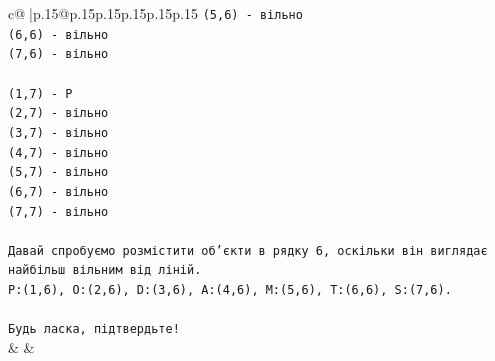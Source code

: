 \documentclass{article}
\begin{document}
{\begin{supertabular}{c@{$\;$}|p{.15\linewidth}@{}p{.15\linewidth}p{.15\linewidth}p{.15\linewidth}p{.15\linewidth}p{.15\linewidth}}
{{{\texttt{(5,6) {-} вільно} \\
\texttt{(6,6) {-} вільно} \\
\texttt{(7,6) {-} вільно} \\
\\ 
\texttt{(1,7) {-} P} \\
\texttt{(2,7) {-} вільно} \\
\texttt{(3,7) {-} вільно} \\
\texttt{(4,7) {-} вільно} \\
\texttt{(5,7) {-} вільно} \\
\texttt{(6,7) {-} вільно} \\
\texttt{(7,7) {-} вільно} \\
\\ 
\texttt{Давай спробуємо розмістити об'єкти в рядку 6, оскільки він виглядає найбільш вільним від ліній.} \\
\texttt{P:(1,6), O:(2,6), D:(3,6), A:(4,6), M:(5,6), T:(6,6), S:(7,6).} \\
\\ 
\texttt{Будь ласка, підтвердьте!} \\
            }
        }
    }
    & & \\ \\


\end{supertabular}}
\end{document}
